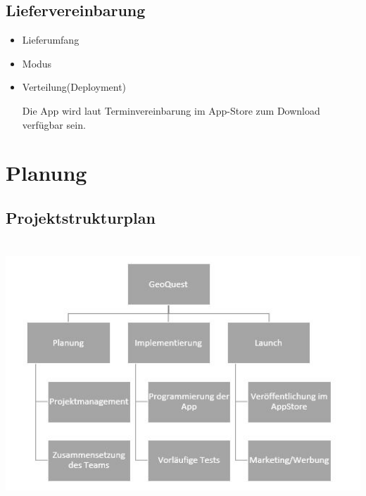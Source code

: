 \subsection{Liefervereinbarung}
\begin{itemize}
	\item Lieferumfang
	\item Modus
	\item Verteilung(Deployment)
	
	Die App wird laut Terminvereinbarung im App-Store zum Download verfügbar sein.
\end{itemize}
\section{Planung}
\subsection{Projektstrukturplan}
\includegraphics[height=10cm]{Projektstrukturplan}\\
